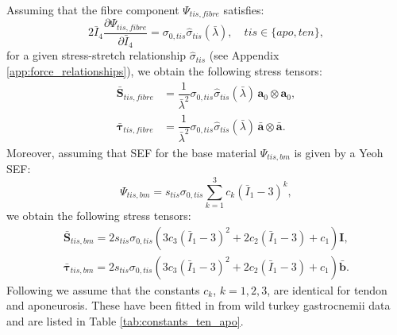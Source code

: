 \documentclass{sfuthesis}
\numberwithin{equation}{section}
\numberwithin{figure}{chapter}
\numberwithin{table}{chapter}
\theoremstyle{definition}
\def\*#1{{\mathbf{#1}}} %
\newcommand{\pder}[2]{\dfrac{\partial #1}{\partial #2}}
\newcommand{\I}{{\bar{I}}}
\def\btau{{\bm{\tau}}}
\def\bchi{{\bm{\chi}}}
\begin{document}
Assuming that the fibre component $\Psi_{tis,fibre}$ satisfies:
\begin{equation}
    2 \I_4 \pder{\Psi_{tis,fibre}}{\I_4} = \sigma_{0,tis} \widehat{\sigma}_{tis}(\bar{\lambda}), \quad tis \in \{apo,ten\},
\end{equation}
for a given stress-stretch relationship $\widehat{\sigma}_{tis}$ (see Appendix \ref{app:force_relationships}), we obtain the following stress tensors:
\begin{align}
    \bar{\*S}_{tis,fibre} &= \dfrac{1}{\bar{\lambda}^2} \sigma_{0,tis} \widehat{\sigma}_{tis}(\bar{\lambda}) \, \*a_0 \otimes \*a_0, \\
    \label{eq:def_tau_bar_tis_fibre}\bar{\btau}_{tis,fibre} &= \dfrac{1}{\bar{\lambda}^2} \sigma_{0,tis} \widehat{\sigma}_{tis}(\bar{\lambda}) \, \bar{\*a} \otimes \bar{\*a}.
\end{align}
Moreover, assuming that SEF for the base material $\Psi_{tis,bm}$ is given by a Yeoh SEF:
\begin{equation} \label{eq:def_Psi_tis_bm}
    \Psi_{tis,bm} = s_{tis} \sigma_{0,tis} \sum_{k=1}^3 c_k (\I_1 - 3)^k,
\end{equation}
we obtain the following stress tensors:
\begin{align}
    \bar{\*S}_{tis, bm} = 2 s_{tis} \sigma_{0,tis}  \left( 3c_3(\I_1-3)^2 + 2c_2 (\I_1-3) + c_1 \right) \*I, \\
    \label{eq:def_tau_bar_tis_bm}\bar{\btau}_{tis,bm} = 2 s_{tis} \sigma_{0,tis}  \left( 3c_3(\I_1-3)^2 + 2c_2 (\I_1-3) + c_1 \right) \bar{\*b}.
\end{align}
Following \cite{Seba} we assume that the constants $c_k$, $k=1,2,3$, are identical for tendon and aponeurosis. These have been fitted in \cite{Seba} from wild turkey gastrocnemii data \cite{Azizi2009} and are listed in Table \ref{tab:constants_ten_apo}.



\end{document}
